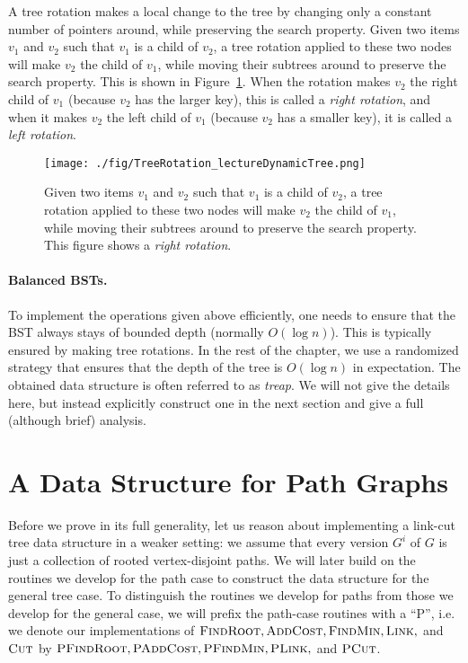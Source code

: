 A tree rotation makes a local change to the tree by changing only a constant number of pointers around, while preserving the search property.
Given two items $v_1$ and $v_2$ such that $v_1$ is a child of $v_2$, a tree rotation applied to these two nodes will make $v_2$ the child of $v_1$, while moving their subtrees around to preserve the search property. This is shown in Figure~\ref{fig:binaryTreeRotation}.
When the rotation makes $v_2$ the right child of $v_1$ (because $v_2$ has the larger key), this is called a \emph{right rotation}, and when it makes $v_2$ the left child of $v_1$ (because $v_2$ has a smaller key), it is called a \emph{left rotation}.

\begin{figure}[ht]
    \centering
    \texttt{[image: ./fig/TreeRotation\_lectureDynamicTree.png]}
    \caption{Given two items $v_1$ and $v_2$ such that $v_1$ is a child of $v_2$, a tree rotation applied to these two nodes will make $v_2$ the child of $v_1$, while moving their subtrees around to preserve the search property. This figure shows a \emph{right rotation}.}
    \label{fig:binaryTreeRotation}
  \end{figure}

\paragraph{Balanced BSTs.} To implement the operations given above efficiently,  one needs to ensure that the BST always stays of bounded depth (normally $O(\log n)$). This is typically ensured by making tree rotations. In the rest of the chapter, we use a randomized strategy that ensures that the depth of the tree is $O(\log n)$ in expectation. The obtained data structure is often referred to as \emph{treap}.  We will not give the details here, but instead explicitly construct one in the next section and give a full (although brief) analysis.

\section{A Data Structure for Path Graphs}

Before we prove  in its full generality, let us reason about implementing a link-cut tree data structure in a weaker setting: we assume that every version $G^i$ of $G$ is just a collection of rooted vertex-disjoint paths.
We will later build on the routines we develop for the path case to construct the data structure for the general tree case.
To distinguish the routines we develop for paths from those we develop for the general case, we will prefix the path-case routines with a ``P'', i.e. we denote our implementations of $\textsc{FindRoot}, \textsc{AddCost}, \textsc{FindMin}, \textsc{Link},$ and $\textsc{Cut}$ by $\textsc{PFindRoot}, \textsc{PAddCost}, \textsc{PFindMin}, \textsc{PLink},$ and $\textsc{PCut}$.

